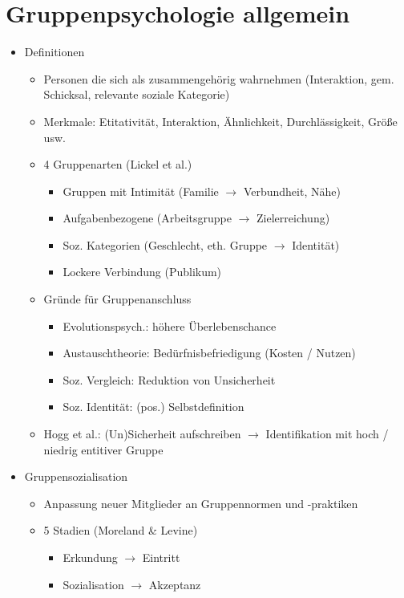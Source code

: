 \documentclass[11pt, paper=a4, twocolumn]{scrartcl}
\begin{document}
	\section{Gruppenpsychologie allgemein}
		\begin{itemize}
			\item Definitionen
				\begin{itemize}
					\item Personen die sich als zusammengehörig wahrnehmen (Interaktion, gem. Schicksal, relevante soziale 
						Kategorie)
					\item Merkmale: Etitativität, Interaktion, Ähnlichkeit, Durchlässigkeit, Größe usw.
					\item 4 Gruppenarten (Lickel et al.)
						\begin{itemize}
							\item Gruppen mit Intimität (Familie $\rightarrow$ Verbundheit, Nähe)
							\item Aufgabenbezogene (Arbeitsgruppe $\rightarrow$ Zielerreichung)
							\item Soz. Kategorien (Geschlecht, eth. Gruppe $\rightarrow$ Identität)
							\item Lockere Verbindung (Publikum)
						\end{itemize}
					\item Gründe für Gruppenanschluss
						\begin{itemize}
							\item Evolutionspsych.: höhere Überlebenschance
							\item Austauschtheorie: Bedürfnisbefriedigung (Kosten / Nutzen)
							\item Soz. Vergleich: Reduktion von Unsicherheit
							\item Soz. Identität: (pos.) Selbstdefinition
						\end{itemize}
					\item Hogg et al.: (Un)Sicherheit aufschreiben $\rightarrow$ Identifikation mit hoch / niedrig entitiver Gruppe
				\end{itemize}
			\item Gruppensozialisation
				\begin{itemize}
					\item Anpassung neuer Mitglieder an Gruppennormen und -praktiken
					\item 5 Stadien (Moreland \& Levine)
						\begin{itemize}
							\item Erkundung $\rightarrow$ Eintritt
							\item Sozialisation $\rightarrow$ Akzeptanz

\end{itemize}
\end{itemize}
\end{itemize}
\end{document}
